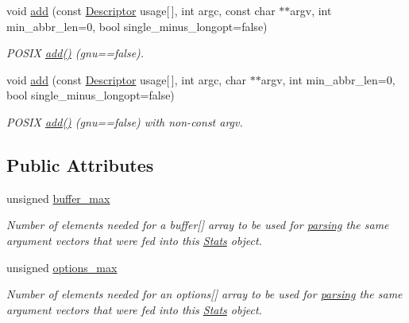 \begin{DoxyCompactItemize}
void \hyperlink{structoption_1_1_stats_a4fc47be5db7f52016e3142a9b9dd0d1e}{add} (const \hyperlink{structoption_1_1_descriptor}{Descriptor} usage\mbox{[}$\,$\mbox{]}, int argc, const char $\ast$$\ast$argv, int min\+\_\+abbr\+\_\+len=0, bool single\+\_\+minus\+\_\+longopt=false)
\begin{DoxyCompactList}\small\item\em P\+O\+S\+IX \hyperlink{structoption_1_1_stats_aa77e2a8b1704527d2d087820f4456143}{add()} (gnu==false). \end{DoxyCompactList}\item 
\mbox{\label{structoption_1_1_stats_ad659604438f79c79f5bc009f2a16ca92}} 
void \hyperlink{structoption_1_1_stats_ad659604438f79c79f5bc009f2a16ca92}{add} (const \hyperlink{structoption_1_1_descriptor}{Descriptor} usage\mbox{[}$\,$\mbox{]}, int argc, char $\ast$$\ast$argv, int min\+\_\+abbr\+\_\+len=0, bool single\+\_\+minus\+\_\+longopt=false)
\begin{DoxyCompactList}\small\item\em P\+O\+S\+IX \hyperlink{structoption_1_1_stats_aa77e2a8b1704527d2d087820f4456143}{add()} (gnu==false) with non-\/const argv. \end{DoxyCompactList}\end{DoxyCompactItemize}
\subsection*{Public Attributes}
\begin{DoxyCompactItemize}
\item 
unsigned \hyperlink{structoption_1_1_stats_a2c9a7b4174f91ba8bcadaa9ad6f0db06}{buffer\+\_\+max}
\begin{DoxyCompactList}\small\item\em Number of elements needed for a {\ttfamily buffer}\mbox{[}\mbox{]} array to be used for \hyperlink{classoption_1_1_parser_a6e0b5778d1cfbd6cd51240e74d01e138}{parsing} the same argument vectors that were fed into this \hyperlink{structoption_1_1_stats}{Stats} object. \end{DoxyCompactList}\item 
unsigned \hyperlink{structoption_1_1_stats_a8121787feb1c7db84fca3ccb012b0473}{options\+\_\+max}
\begin{DoxyCompactList}\small\item\em Number of elements needed for an {\ttfamily options}\mbox{[}\mbox{]} array to be used for \hyperlink{classoption_1_1_parser_a6e0b5778d1cfbd6cd51240e74d01e138}{parsing} the same argument vectors that were fed into this \hyperlink{structoption_1_1_stats}{Stats} object. \end{DoxyCompactList}\end{DoxyCompactItemize}


